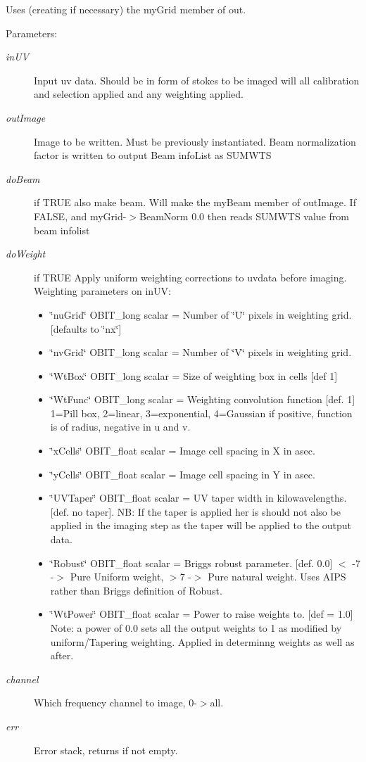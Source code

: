 Uses (creating if necessary) the my\-Grid member of out. \begin{Desc}
\item[Parameters:]
\begin{description}
\item[{\em in\-UV}]Input uv data. Should be in form of stokes to be imaged will all calibration and selection applied and any weighting applied. \item[{\em out\-Image}]Image to be written. Must be previously instantiated. Beam normalization factor is written to output Beam info\-List as SUMWTS \item[{\em do\-Beam}]if TRUE also make beam. Will make the my\-Beam member of out\-Image. If FALSE, and my\-Grid-$>$Beam\-Norm 0.0 then reads SUMWTS value from beam infolist \item[{\em do\-Weight}]if TRUE Apply uniform weighting corrections to uvdata before imaging. Weighting parameters on in\-UV: \begin{itemize}
\item \char`\"{}nu\-Grid\char`\"{} OBIT\_\-long scalar = Number of \char`\"{}U\char`\"{} pixels in weighting grid. [defaults to \char`\"{}nx\char`\"{}] \item \char`\"{}nv\-Grid\char`\"{} OBIT\_\-long scalar = Number of \char`\"{}V\char`\"{} pixels in weighting grid. \item \char`\"{}Wt\-Box\char`\"{} OBIT\_\-long scalar = Size of weighting box in cells [def 1] \item \char`\"{}Wt\-Func\char`\"{} OBIT\_\-long scalar = Weighting convolution function [def. 1] 1=Pill box, 2=linear, 3=exponential, 4=Gaussian if positive, function is of radius, negative in u and v. \item \char`\"{}x\-Cells\char`\"{} OBIT\_\-float scalar = Image cell spacing in X in asec. \item \char`\"{}y\-Cells\char`\"{} OBIT\_\-float scalar = Image cell spacing in Y in asec. \item \char`\"{}UVTaper\char`\"{} OBIT\_\-float scalar = UV taper width in kilowavelengths. [def. no taper]. NB: If the taper is applied her is should not also be applied in the imaging step as the taper will be applied to the output data. \item \char`\"{}Robust\char`\"{} OBIT\_\-float scalar = Briggs robust parameter. [def. 0.0] $<$ -7 -$>$ Pure Uniform weight, $>$7 -$>$ Pure natural weight. Uses AIPS rather than Briggs definition of Robust. \item \char`\"{}Wt\-Power\char`\"{} OBIT\_\-float scalar = Power to raise weights to. [def = 1.0] Note: a power of 0.0 sets all the output weights to 1 as modified by uniform/Tapering weighting. Applied in determinng weights as well as after. \end{itemize}
\item[{\em channel}]Which frequency channel to image, 0-$>$all. \item[{\em err}]Error stack, returns if not empty. \end{description}
\end{Desc}
